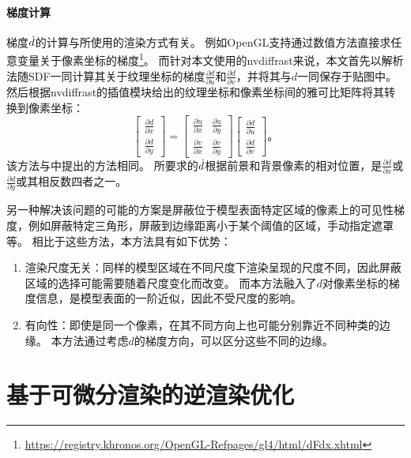 \paragraph{梯度计算}
梯度$\dot d$的计算与所使用的渲染方式有关。
例如OpenGL支持通过数值方法直接求任意变量关于像素坐标的梯度\footnote{\url{https://registry.khronos.org/OpenGL-Refpages/gl4/html/dFdx.xhtml}}。
而针对本文使用的nvdiffrast来说，本文首先以解析法随SDF一同计算其关于纹理坐标的梯度$\frac{\partial d}{\partial u}$和$\frac{\partial d}{\partial v}$，并将其与$d$一同保存于贴图中。
然后根据nvdiffrast的插值模块给出的纹理坐标和像素坐标间的雅可比矩阵将其转换到像素坐标：
\begin{equation}
    \begin{bmatrix}
        \frac{\partial d}{\partial x} \\
        \frac{\partial d}{\partial y}
    \end{bmatrix} = \begin{bmatrix}
        \frac{\partial u}{\partial x} & \frac{\partial u}{\partial y} \\
        \frac{\partial v}{\partial x} & \frac{\partial v}{\partial y}
    \end{bmatrix} \begin{bmatrix}
        \frac{\partial d}{\partial u} \\
        \frac{\partial d}{\partial v}
    \end{bmatrix}
\text{。}
\end{equation}
该方法与\citet{sdf_glyphs}中提出的方法相同。
所要求的$\dot d$根据前景和背景像素的相对位置，是$\frac{\partial d}{\partial x}$或$\frac{\partial d}{\partial y}$或其相反数四者之一。

另一种解决该问题的可能的方案是屏蔽位于模型表面特定区域的像素上的可见性梯度，例如屏蔽特定三角形，屏蔽到边缘距离小于某个阈值的区域，手动指定遮罩等。
相比于这些方法，本方法具有如下优势：
\begin{enumerate}
\item 渲染尺度无关：同样的模型区域在不同尺度下渲染呈现的尺度不同，因此屏蔽区域的选择可能需要随着尺度变化而改变。
而本方法融入了$d$对像素坐标的梯度信息，是模型表面的一阶近似，因此不受尺度的影响。
\item 有向性：即使是同一个像素，在其不同方向上也可能分别靠近不同种类的边缘。
本方法通过考虑$d$的梯度方向，可以区分这些不同的边缘。
\end{enumerate}

\section{基于可微分渲染的逆渲染优化}

